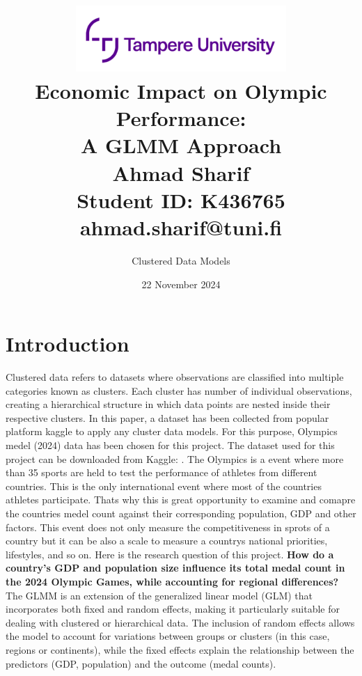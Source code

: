 \documentclass[a4paper,12pt]{article}
\title{
    \vspace{2cm}
    \includegraphics[width=0.6\textwidth]{images/logo.png}\\[2cm]
    \textbf{Economic Impact on Olympic Performance:}\\
    \textbf{A GLMM Approach}\\[2cm]
    \vfill
    \large Ahmad Sharif\\
    Student ID: K436765\\
    ahmad.sharif@tuni.fi\\
    \vspace{2cm}
}
\author{Clustered Data Models}
\date{22 November 2024}
\begin{document}
\maketitle
\newpage

\tableofcontents
\newpage








\section{Introduction}
Clustered data refers to datasets where observations are classified into multiple categories known as clusters. Each cluster has number of individual observations, creating a hierarchical structure in which data points are nested inside their respective clusters.
\newline
\newline
In this paper, a dataset has been collected from popular platform kaggle to apply any cluster data models. For this purpose, Olympics medel (2024) data has been chosen for this project.
\newline
\newline
The dataset used for this project can be downloaded from Kaggle: \cite{KaggleData}.
\newline
\newline
The Olympics is a event where more than 35 sports are held to test the performance of athletes from different countries. This is the only international event where most of the countries athletes participate. Thats why this is great opportunity to examine and comapre the countries medel count against their corresponding population, GDP and other factors. This event does not only measure the competitiveness in sprots of a country but it can be also a scale to measure a countrys national priorities, lifestyles, and so on.
\newline
\newline
Here is the research question of this project.
\newline
\textbf{How do a country's GDP and population size influence its total medal count in the 2024 Olympic Games, while accounting for regional differences?}
\newline
\newline
 The GLMM is an extension of the generalized linear model (GLM) that incorporates both fixed and random effects, making it particularly suitable for dealing with clustered or hierarchical data. The inclusion of random effects allows the model to account for variations between groups or clusters (in this case, regions or continents), while the fixed effects explain the relationship between the predictors (GDP, population) and the outcome (medal counts).
\end{document}
